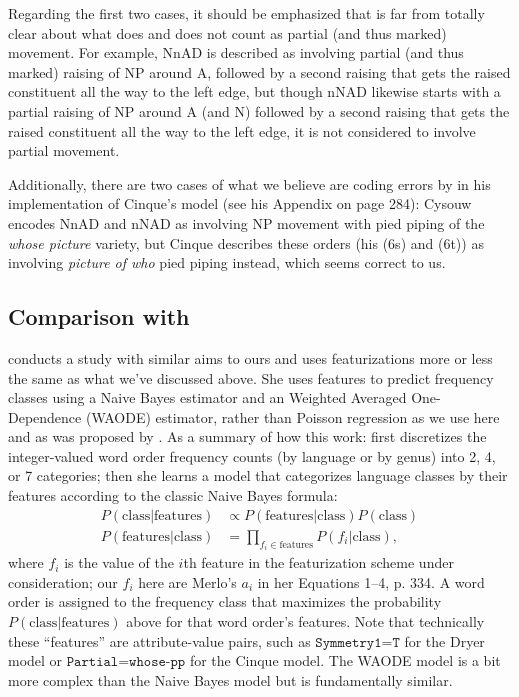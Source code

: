 \documentclass[11pt]{article}
\begin{document}
%
Regarding the first two cases, it should be emphasized that
\citet{cinque2005deriving} is far from totally clear about what does and
does not count as partial (and thus marked) movement.  For example,
NnAD is described as involving partial (and thus marked) raising of NP
around A, followed by a second raising that gets the raised
constituent all the way to the left edge, but though nNAD likewise starts
with a partial raising of NP around A (and N) followed by a second
raising that gets the raised constituent all the way to the left edge,
it is not considered to involve partial movement.

Additionally, there are two cases of what we believe are coding errors
by\citet{cysouw2010towards} in his implementation of Cinque's model
(see his Appendix on page 284): Cysouw encodes NnAD and nNAD as
involving NP movement with pied piping of the \emph{whose picture}
variety, but Cinque describes these orders (his (6s) and (6t)) as
involving \emph{picture of who} pied piping instead, which seems
correct to us.

\subsection{Comparison with \citet{merlo2015predicting}}

\citet{merlo2015predicting} conducts a study with similar aims to ours and uses featurizations more or less the same as what we've discussed above.
She uses features to predict frequency classes using a Naive Bayes estimator and an Weighted Averaged One-Dependence (WAODE) estimator, rather than Poisson regression as we use here and as was proposed by \citet{cysouw2010dealing}.
As a summary of how this work: \citet{merlo2015predicting} first discretizes the integer-valued word order frequency counts (by language or by genus) into 2, 4, or 7 categories; then she learns a model that categorizes language classes by their features according to the classic Naive Bayes formula:
\begin{align*}
  \nonumber
  P(\text{class}|\text{features}) &\propto P(\text{features}|\text{class}) P(\text{class}) \\
  \nonumber
  P(\text{features}|\text{class}) &= \prod_{f_i \in \text{features}} P(f_i | \text{class}),
\end{align*}
where $f_i$ is the value of the $i$th feature in the featurization scheme under consideration; our $f_i$ here are Merlo's $a_i$ in her Equations 1--4, p. 334. A word order is assigned to the frequency class that maximizes the probability $P(\text{class}|\text{features})$ above for that word order's features.
Note that technically these ``features'' are attribute-value pairs, such as $\texttt{Symmetry1=T}$ for the Dryer model or $\texttt{Partial=whose-pp}$ for the Cinque model.
The WAODE model is a bit more complex than the Naive Bayes model but is fundamentally similar.
\end{document}
